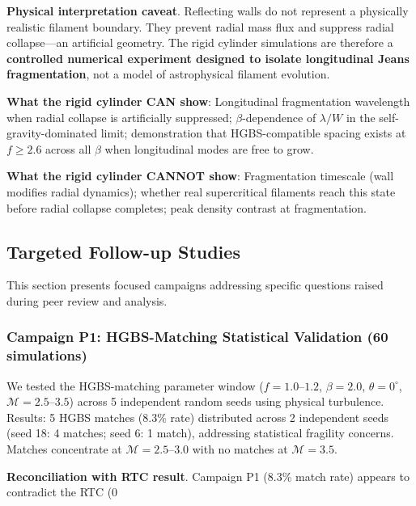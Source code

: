 \documentclass[twocolumn]{mnras}
\begin{document}
\textbf{Physical interpretation caveat}. Reflecting walls do not represent a physically realistic filament boundary. They prevent radial mass flux and suppress radial collapse---an artificial geometry. The rigid cylinder simulations are therefore a \textbf{controlled numerical experiment designed to isolate longitudinal Jeans fragmentation}, not a model of astrophysical filament evolution.

\textbf{What the rigid cylinder CAN show}: Longitudinal fragmentation wavelength when radial collapse is artificially suppressed; $\beta$-dependence of $\lambda/W$ in the self-gravity-dominated limit; demonstration that HGBS-compatible spacing exists at $f \geq 2.6$ across all $\beta$ when longitudinal modes are free to grow.

\textbf{What the rigid cylinder CANNOT show}: Fragmentation timescale (wall modifies radial dynamics); whether real supercritical filaments reach this state before radial collapse completes; peak density contrast at fragmentation.

\subsection{Targeted Follow-up Studies}

This section presents focused campaigns addressing specific questions raised during peer review and analysis.

\subsubsection{Campaign P1: HGBS-Matching Statistical Validation (60 simulations)}

We tested the HGBS-matching parameter window ($f = 1.0$--$1.2$, $\beta = 2.0$, $\theta = 0^\circ$, $\mathcal{M} = 2.5$--$3.5$) across 5 independent random seeds using physical turbulence. Results: 5 HGBS matches (8.3\% rate) distributed across 2 independent seeds (seed 18: 4 matches; seed 6: 1 match), addressing statistical fragility concerns. Matches concentrate at $\mathcal{M} = 2.5$--$3.0$ with no matches at $\mathcal{M} = 3.5$.

\textbf{Reconciliation with RTC result}. Campaign P1 (8.3\% match rate) appears to contradict the RTC (0%
\end{document}
